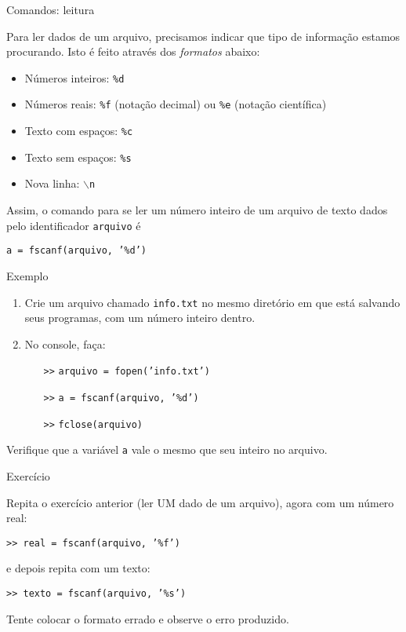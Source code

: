 \documentclass[hyperref={pdfpagelabels=false}]{beamer}
\begin{document}
\begin{frame}{Comandos: leitura}

  Para ler dados de um arquivo, precisamos indicar que tipo de informação estamos procurando. Isto é feito através dos \emph{formatos} abaixo:

  \begin{itemize}
  \item Números inteiros: \texttt{\%d}
  \item Números reais: \texttt{\%f} (notação decimal) ou \texttt{\%e} (notação científica)
  \item Texto com espaços: \texttt{\%c}
  \item Texto sem espaços: \texttt{\%s}
  \item Nova linha: \texttt{$\backslash$n}
  \end{itemize}
    
  Assim, o comando para se ler um número inteiro de um arquivo de texto dados pelo identificador \texttt{arquivo} é
  \begin{center}
    \texttt{a = fscanf(arquivo, '\%d')}
  \end{center}
\end{frame}
  
\begin{frame}{Exemplo}
  \begin{enumerate}
  \item Crie um arquivo chamado \alert{\texttt{info.txt}} no mesmo diretório em que está salvando seus programas, com um número inteiro dentro.
  \item No console, faça:
    \begin{itemize}
    \item[\texttt{>>}] \texttt{arquivo = fopen('info.txt')}
    \item[\texttt{>>}] \texttt{a = fscanf(arquivo, '\%d')}
    \item[\texttt{>>}] \texttt{fclose(arquivo)}
    \end{itemize}
  \end{enumerate}

Verifique que a variável \alert{\texttt{a}} vale o mesmo que seu inteiro no arquivo.
 
\end{frame}

\begin{frame}{Exercício}

  Repita o exercício anterior (ler UM dado de um arquivo), agora com um número real:

  \texttt{>> real = fscanf(arquivo, '\%f')}

  e depois repita com um texto:

  \texttt{>> texto = fscanf(arquivo, '\%s')}

  \vfill

  Tente colocar o formato errado e observe o erro produzido.
\end{frame}
\end{document}
